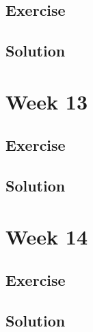 \documentclass[
]{book}
\begin{document}
\hypertarget{exercise-8}{%
\section{Exercise}\label{exercise-8}}

\hypertarget{solution-8}{%
\section{Solution}\label{solution-8}}

\hypertarget{week-13}{%
\chapter{Week 13}\label{week-13}}

\hypertarget{exercise-9}{%
\section{Exercise}\label{exercise-9}}

\hypertarget{solution-9}{%
\section{Solution}\label{solution-9}}

\hypertarget{week-14}{%
\chapter{Week 14}\label{week-14}}

\hypertarget{exercise-10}{%
\section{Exercise}\label{exercise-10}}

\hypertarget{solution-10}{%
\section{Solution}\label{solution-10}}

  
\end{document}
